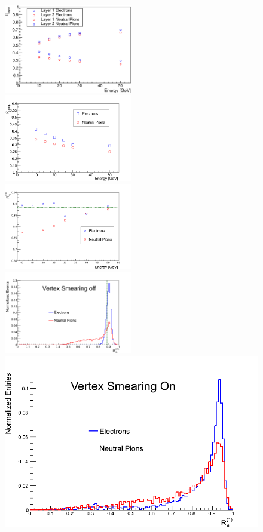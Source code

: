 \begin{figure}[!h]
   \includegraphics[width=0.5\textwidth]{figures/rhoLayer12.eps}
   \includegraphics[width=0.5\textwidth]{figures/rhoComp.png}\\
   \includegraphics[width=0.5\textwidth]{figures/retaonelrCloseup.png}
   \includegraphics[width=0.5\textwidth]{figures/retaonelrTwenty.png}\\
  \includegraphics[width=0.5\linewidth]{figures/RetaVx.png}%

\end{figure}
